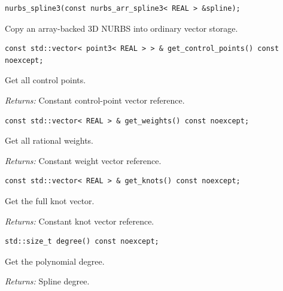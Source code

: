 \par\noindent\begin{minipage}{\linewidth}
\begin{lstlisting}[style=apireference]
nurbs_spline3(const nurbs_arr_spline3< REAL > &spline);
\end{lstlisting}
{\footnotesize Copy an array-backed 3D NURBS into ordinary vector storage.\par}
\end{minipage}\par\vspace{1pt}
\par\noindent\begin{minipage}{\linewidth}
\begin{lstlisting}[style=apireference]
const std::vector< point3< REAL > > & get_control_points() const noexcept;
\end{lstlisting}
{\footnotesize Get all control points.\par}
{\footnotesize\textit{Returns:} Constant control-point vector reference.\par}
\end{minipage}\par\vspace{1pt}
\par\noindent\begin{minipage}{\linewidth}
\begin{lstlisting}[style=apireference]
const std::vector< REAL > & get_weights() const noexcept;
\end{lstlisting}
{\footnotesize Get all rational weights.\par}
{\footnotesize\textit{Returns:} Constant weight vector reference.\par}
\end{minipage}\par\vspace{1pt}
\par\noindent\begin{minipage}{\linewidth}
\begin{lstlisting}[style=apireference]
const std::vector< REAL > & get_knots() const noexcept;
\end{lstlisting}
{\footnotesize Get the full knot vector.\par}
{\footnotesize\textit{Returns:} Constant knot vector reference.\par}
\end{minipage}\par\vspace{1pt}
\par\noindent\begin{minipage}{\linewidth}
\begin{lstlisting}[style=apireference]
std::size_t degree() const noexcept;
\end{lstlisting}
{\footnotesize Get the polynomial degree.\par}
{\footnotesize\textit{Returns:} Spline degree.\par}
\end{minipage}\par\vspace{1pt}
